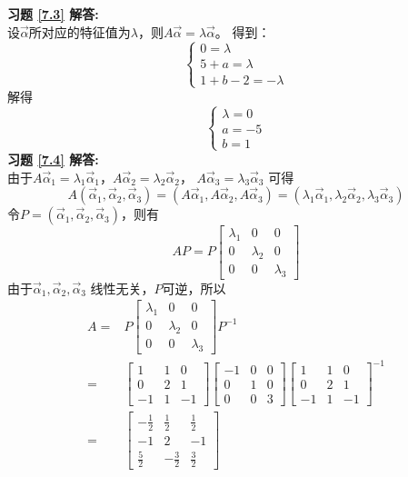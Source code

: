 \textbf{习题 \ref{7.3} 解答:}\\
设$\vec{\alpha}$所对应的特征值为$\lambda$，则$A\vec{\alpha}=\lambda\vec{\alpha}$。
得到：
\begin{equation*}
  \begin{cases}
  0 = \lambda\\
  5+a = \lambda\\
  1+b-2= -\lambda
  \end{cases}
\end{equation*}
解得
\begin{equation*}
  \begin{cases}
  \lambda=0\\
  a = -5\\
  b = 1
  \end{cases}
\end{equation*}
\textbf{习题 \ref{7.4} 解答:}\\
由于$A\vec{\alpha}_1=\lambda_1\vec{\alpha}_1$，$A\vec{\alpha}_2=\lambda_2\vec{\alpha}_2$，
$A\vec{\alpha}_3=\lambda_3\vec{\alpha}_3$ 可得
\begin{equation*}
A(\vec{\alpha}_1,\vec{\alpha}_2,\vec{\alpha}_3)
=(A\vec{\alpha}_1,A\vec{\alpha}_2,A\vec{\alpha}_3)
=(\lambda_1\vec{\alpha}_1,\lambda_2\vec{\alpha}_2,\lambda_3\vec{\alpha}_3)
\end{equation*}
令$P=(\vec{\alpha}_1,\vec{\alpha}_2,\vec{\alpha}_3)$，则有
\begin{equation*}
AP=P\begin{bmatrix}\lambda_1&0&0\\0&\lambda_2&0\\0&0&\lambda_3\end{bmatrix}
\end{equation*}
由于$\vec{\alpha}_1,\vec{\alpha}_2,\vec{\alpha}_3$ 线性无关，$P$可逆，所以
\begin{align*}
A=&P\begin{bmatrix}\lambda_1&0&0\\0&\lambda_2&0\\0&0&\lambda_3\end{bmatrix}P^{-1}\\
 =&\begin{bmatrix}1&1&0\\0&2&1\\-1&1&-1\end{bmatrix}
   \begin{bmatrix}-1&0&0\\0&1&0\\0&0&3\end{bmatrix}
   \begin{bmatrix}1&1&0\\0&2&1\\-1&1&-1\end{bmatrix}^{-1}\\
  =&\begin{bmatrix}-\frac{1}{2}&\frac{1}{2}&\frac{1}{2}\\
     -1&2&-1\\ \frac{5}{2}&-\frac{3}{2}&\frac{3}{2}\end{bmatrix}
\end{align*}
